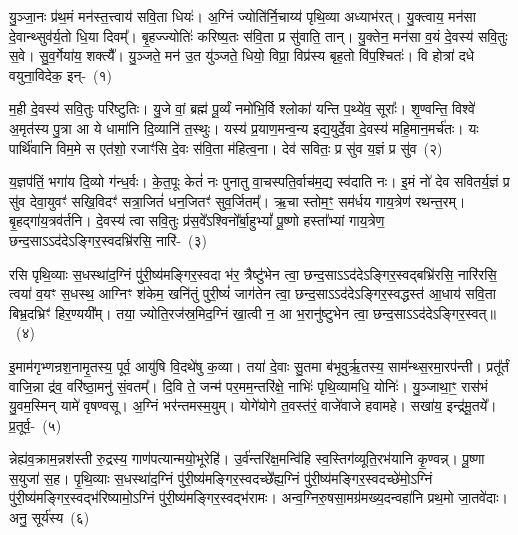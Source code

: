 \setcounter{anuvakam}{0}
यु॒ञ्जा॒नः प्र॑थ॒मं मन॑स्त॒त्त्वाय॑ सवि॒ता धियः॑। अ॒ग्निं ज्योति॑र्नि॒चाय्य॑ पृथि॒व्या अध्याभ॑रत्। यु॒क्त्वाय॒ मन॑सा दे॒वान्थ्सुव॑र्य॒तो धि॒या दिवम्᳚। बृ॒हज्ज्योतिः॑ करिष्य॒तः स॑वि॒ता प्र सु॑वाति॒ तान्। यु॒क्तेन॒ मन॑सा व॒यं दे॒वस्य॑ सवि॒तुः स॒वे। सु॒व॒र्गेया॑य॒ शक्त्यै᳚। यु॒ञ्जते॒ मन॑ उ॒त यु॑ञ्जते॒ धियो॒ विप्रा॒ विप्र॑स्य बृह॒तो वि॑प॒श्चितः॑। वि होत्रा॑ दधे वयुना॒विदेक॒ इन्-~(१)\ip

म॒ही दे॒वस्य॑ सवि॒तुः परि॑ष्टुतिः। यु॒जे वां॒ ब्रह्म॑ पू॒र्व्यं नमो॑भि॒र्वि श्लोका॑ यन्ति प॒थ्ये॑व॒ सूराः᳚। शृ॒ण्वन्ति॒ विश्वे॑ अ॒मृत॑स्य पु॒त्रा आ ये धामा॑नि दि॒व्यानि॑ त॒स्थुः। यस्य॑ प्र॒याण॒मन्व॒न्य इद्य॒युर्दे॒वा दे॒वस्य॑ महि॒मान॒मर्च॑तः। यः पार्थि॑वानि विम॒मे स एत॑शो॒ रजाꣳ॑सि दे॒वः स॑वि॒ता म॑हित्व॒ना। देव॑ सवितः॒ प्र सु॑व य॒ज्ञं प्र सु॑व~(२)\ip

य॒ज्ञप॑तिं॒ भगा॑य दि॒व्यो ग॑न्ध॒र्वः। के॒त॒पूः केतं॑ नः पुनातु वा॒चस्पति॒र्वाच॑म॒द्य स्व॑दाति नः। इ॒मं नो॑ देव सवितर्य॒ज्ञं प्र सु॑व देवा॒युवꣳ॑ सखि॒विदꣳ॑ सत्रा॒जितं॑ धन॒जितꣳ॑ सुव॒र्जितम्᳚। ऋ॒चा स्तोम॒ꣳ॒ सम॑र्धय गाय॒त्रेण॑ रथन्त॒रम्। बृ॒हद्गा॑य॒त्रव॑र्तनि। दे॒वस्य॑ त्वा सवि॒तुः प्र॑स॒वे᳚\-ऽश्विनो᳚र्बा॒हु\-भ्यां᳚ पू॒ष्णो हस्ता᳚भ्यां गाय॒त्रेण॒ छन्द॒सा\-ऽऽ\-द॑दे\-ऽङ्गिर॒स्वदभ्रि॑रसि॒ नारि॑-~(३)\ip

रसि पृथि॒व्याः स॒धस्था॑द॒ग्निं पु॑री॒ष्य॑मङ्गिर॒\-स्वदा भ॑र॒ त्रैष्टु॑भेन त्वा॒ छन्द॒सा\-ऽऽ\-द॑दे\-ऽङ्गिर॒स्वद्बभ्रि॑रसि॒ नारि॑रसि॒ त्वया॑ व॒यꣳ स॒धस्थ॒ आग्निꣳ श॑केम॒ खनि॑तुं पुरी॒ष्यं॑ जाग॑तेन त्वा॒ छन्द॒सा\-ऽऽ\-द॑दे\-ऽङ्गिर॒स्वद्धस्त॑ आ॒धाय॑ सवि॒ता बिभ्र॒दभ्रिꣳ॑ हिर॒ण्ययी᳚म्। तया॒ ज्योति॒रज॑स्र॒मिद॒ग्निं खा॒त्वी न॒ आ भ॒रानु॑ष्टुभेन त्वा॒ छन्द॒सा\-ऽऽ\-द॑दे\-ऽङ्गिर॒स्वत्॥~(४)\ip

{\anuvakamend[{इद्य॒ज्ञं प्र सु॑व॒ नारि॒रानु॑ष्टुभेन त्वा॒ छन्द॑सा॒ त्रीणि॑ च}]}

इ॒माम॑गृभ्णन्रश॒नामृ॒तस्य॒ पूर्व॒ आयु॑षि वि॒दथे॑षु क॒व्या। तया॑ दे॒वाः सु॒तमा ब॑भूवुर्\mbox{}ऋ॒तस्य॒ साम᳚न्थ्स॒रमा॒रप॑न्ती। प्रतू᳚र्तं वाजि॒न्ना द्र॑व॒ वरि॑ष्ठा॒मनु॑ सं॒वतम्᳚। दि॒वि ते॒ जन्म॑ पर॒मम॒न्तरि॑क्षे॒ नाभिः॑ पृथि॒व्यामधि॒ योनिः॑। यु॒ञ्जाथा॒ꣳ॒ रास॑भं यु॒वम॒स्मिन् यामे॑ वृषण्वसू। अ॒ग्निं भर॑न्तमस्म॒युम्। योगे॑योगे त॒वस्त॑रं॒ वाजे॑वाजे हवामहे। सखा॑य॒ इन्द्र॑मू॒तये᳚। प्र॒तूर्व॒-~(५)\ip

न्नेह्य॑व॒क्राम॒न्नश॑स्ती रु॒द्रस्य॒ गाण॑पत्यान्मयो॒भूरेहि॑। उ॒र्व॑न्तरि॑क्ष॒\-मन्वि॑हि स्व॒स्तिग॑व्यूति॒\-रभ॑यानि कृ॒ण्वन्न्। पू॒ष्णा स॒युजा॑ स॒ह। पृ॒थि॒व्याः स॒धस्था॑द॒ग्निं पु॑री॒ष्य॑मङ्गिर॒\-स्वदच्छे᳚ह्य॒ग्निं पु॑री॒ष्य॑मङ्गिर॒\-स्वदच्छे॑मो॒\-ऽग्निं पु॑री॒ष्य॑मङ्गिर॒\-स्वद्भ॑रिष्यामो॒\-ऽग्निं पु॑री॒ष्य॑मङ्गिर॒\-स्वद्भ॑रामः। अन्व॒ग्नि\-रु॒ष\-सा॒मग्र॑मख्य॒दन्वहा॑नि प्रथ॒मो जा॒तवे॑दाः। अनु॒ सूर्य॑स्य~(६)\ip

